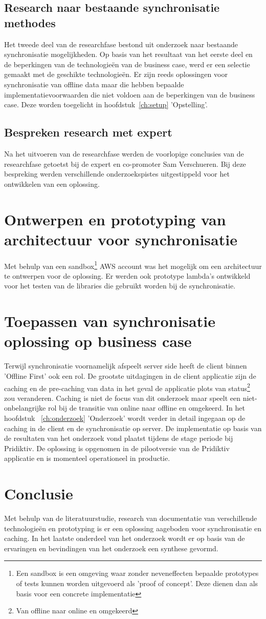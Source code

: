 \subsection{Research naar bestaande synchronisatie methodes}
Het tweede deel van de researchfase bestond uit onderzoek naar bestaande synchronisatie mogelijkheden. Op basis van het resultaat van het eerste deel en de beperkingen van de technologie\"en van de business case, werd er een selectie gemaakt met de geschikte technologie\"en. Er zijn reeds oplossingen voor synchronisatie van offline data maar die hebben bepaalde implementatievoorwaarden die niet voldoen aan de beperkingen van de business case. Deze worden toegelicht in hoofdstuk~\ref{ch:setup} 'Opstelling'.
\subsection{Bespreken research met expert}
Na het uitvoeren van de researchfase werden de voorlopige conclusies van de researchfase getoetst bij de expert en co-promoter Sam Verschueren. Bij deze bespreking werden verschillende onderzoekspistes uitgestippeld voor het ontwikkelen van een oplossing.
\section{Ontwerpen en prototyping van architectuur voor synchronisatie}
Met behulp van een sandbox\footnote{Een sandbox is een omgeving waar zonder neveneffecten bepaalde prototypes of tests kunnen worden uitgevoerd als 'proof of concept'. Deze dienen dan als basis voor een concrete implementatie} AWS account was het mogelijk om een architectuur te ontwerpen voor de oplossing. Er werden ook prototype lambda's ontwikkeld voor het testen van de libraries die gebruikt worden bij de synchronisatie.
\section{Toepassen van synchronisatie oplossing op business case}
Terwijl synchronisatie voornamelijk afspeelt server side heeft de client binnen 'Offline First' ook een rol. De grootste uitdagingen in de client applicatie zijn de caching en de pre-caching van data in het geval de applicatie plots van status\footnote{Van offline naar online en omgekeerd} zou veranderen. Caching is niet de focus van dit onderzoek maar speelt een niet-onbelangrijke rol bij de transitie van online naar offline en omgekeerd. In het hoofdstuk ~\ref{ch:onderzoek} 'Onderzoek' wordt verder in detail ingegaan op de caching in de client en de synchronisatie op server. De implementatie op basis van de resultaten van het onderzoek vond plaatst tijdens de stage periode bij Pridiktiv. De oplossing is opgenomen in de pilootversie van de Pridiktiv applicatie en is momenteel operationeel in productie.
\section{Conclusie}
Met behulp van de literatuurstudie, research van documentatie van verschillende technologie\"en en prototyping is er een oplossing aageboden voor synchronisatie en caching. In het laatste onderdeel van het onderzoek wordt er op basis van de ervaringen en bevindingen van het onderzoek een synthese gevormd.